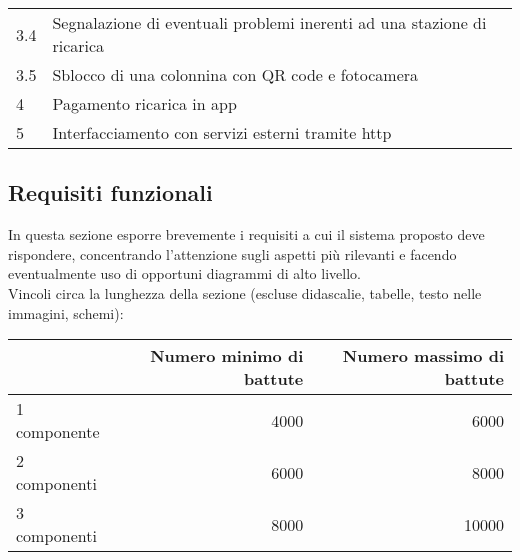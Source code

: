 \begin{tabular}{l|ll}
    3.4              & Segnalazione di eventuali problemi inerenti ad una stazione di ricarica           \\
    3.5              & Sblocco di una colonnina con QR code e fotocamera                                 \\
    4                & Pagamento ricarica in app                                                         \\
    5                & Interfacciamento con servizi esterni tramite http                                 \\
    \hline
\end{tabular}

\subsection*{Requisiti funzionali}
In questa sezione esporre brevemente i requisiti a cui il sistema proposto deve rispondere, concentrando l'attenzione sugli aspetti più rilevanti e facendo eventualmente uso di opportuni diagrammi di alto livello.\\

Vincoli circa la lunghezza della sezione (escluse didascalie, tabelle, testo nelle immagini, schemi):

\vspace{1cm}
\begin{tabular}{l|rr}
                 & Numero minimo di battute & Numero massimo di battute \\
    \hline
    1 componente & 4000                     & 6000                      \\
    2 componenti & 6000                     & 8000                      \\
    3 componenti & 8000                     & 10000                     \\
    \hline
\end{tabular}


\newpage
